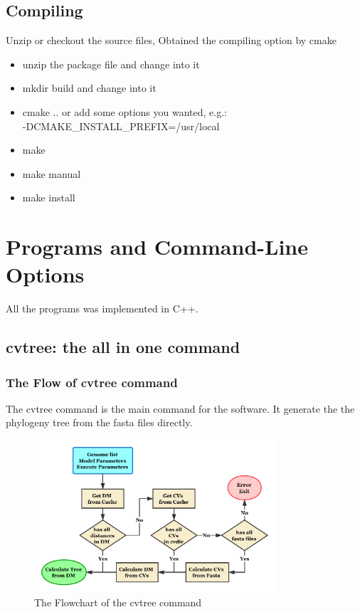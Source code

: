 \documentclass[a4paper,12pt]{article}
\begin{document}
\subsection{Compiling}
Unzip or checkout the source files, Obtained the compiling option by
cmake
\begin{itemize}
	\item unzip the package file and change into it
	\item mkdir build and change into it
	\item cmake .. or add some options you wanted, e.g.:\\ -DCMAKE\_INSTALL\_PREFIX=/usr/local
  \item make
  \item make manual
	\item make install
\end{itemize}

\section{Programs and Command-Line Options}
All the programs was implemented in C++.

\subsection{cvtree: the all in one command}
\subsubsection{The Flow of cvtree command}
The cvtree command is the main command for the software. It generate the the phylogeny tree 
from the fasta files directly. 

\begin{figure}[!h]
  \centering
  \includegraphics[width=0.8\textwidth]{Flowchart.pdf}
  \caption{The Flowchart of the cvtree command}
\end{figure}
\end{document}
